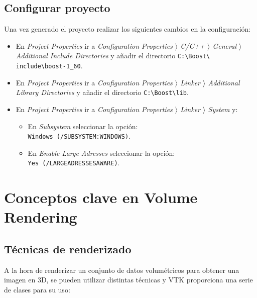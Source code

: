 \subsection{Configurar proyecto}

Una vez generado el proyecto realizar los siguientes cambios en la configuración: 
\begin{itemize}
	\item En \textit{Project Properties} ir a \textit{Configuration Properties $ \rangle $ C/C++ $ \rangle $ General $ \rangle $ Additional Include Directories} y añadir el directorio \texttt{C:\textbackslash Boost\textbackslash \\  include\textbackslash boost-1\_60}.
	\item En \textit{Project Properties} ir a \textit{Configuration Properties $ \rangle $ Linker $ \rangle $ Additional Library Directories} y añadir el directorio \texttt{C:\textbackslash Boost\textbackslash lib}.
	\item En \textit{Project Properties} ir a \textit{Configuration Properties $ \rangle $ Linker $ \rangle $ System} y:
	\begin{itemize}
		\item En \textit{Subsystem} seleccionar la opción: \\ \texttt{Windows (/SUBSYSTEM:WINDOWS)}.
		\item En \textit{Enable Large Adresses} seleccionar la opción: \\ \texttt{Yes (/LARGEADRESSESAWARE)}.
	\end{itemize}
\end{itemize}

\section{Conceptos clave en Volume Rendering}

\subsection{Técnicas de renderizado}

A la hora de renderizar un conjunto de datos volumétricos para obtener una imagen en 3D, se pueden utilizar distintas técnicas y VTK proporciona una serie de clases para su uso:

